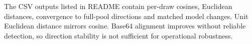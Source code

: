 \documentclass[10pt]{article}
\begin{document}
The CSV outputs listed in README contain per-draw cosines, Euclidean distances, convergence to full-pool directions and matched model changes. Unit Euclidean distance mirrors cosine. Base64 alignment improves without reliable detection, so direction stability is not sufficient for operational robustness.
\end{document}
